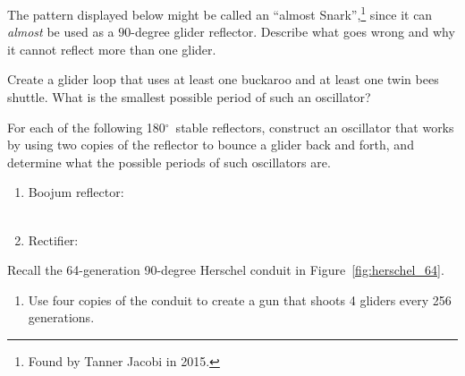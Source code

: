 \begin{multicols}{2}
	
	\mfilbreak
	
	
	\begin{problemstar}\label{exer:almost_snark}
		The pattern displayed below might be called an ``almost Snark'',\footnote{Found by Tanner Jacobi in 2015.} since it can \emph{almost} be used as a $90$-degree glider reflector. Describe what goes wrong and why it cannot reflect more than one glider.
		
		\begin{center}
		\end{center}
	\end{problemstar}
	
	
	\mfilbreak
	
	
	\begin{problem}\label{exer:buckaroo_loop}
		Create a glider loop that uses at least one buckaroo and at least one twin bees shuttle. What is the smallest possible period of such an oscillator? %
	\end{problem}
	
	
	\mfilbreak
	
	\begin{problem}\label{exer:new_reflectors}
		For each of the following 180$^\circ$~stable reflectors, construct an oscillator that works by using two copies of the reflector to bounce a glider back and forth, and determine what the possible periods of such oscillators are.
		\begin{enumerate}[label=\bf\color{ocre}(\alph*)]
			\item Boojum reflector: \\ \\[0.5em]
			
			\item Rectifier: \\ 
		\end{enumerate}
	\end{problem}
	
	
	\mfilbreak
	
	
	\begin{problem}\label{exer:machine_gun}
		Recall the 64-generation 90-degree Herschel conduit in Figure~\ref{fig:herschel_64}.
		\begin{enumerate}[label=\bf\color{ocre}(\alph*)]
			\item Use four copies of the conduit to create a gun that shoots 4 gliders every 256 generations.
			

\end{enumerate}
\end{problem}
\end{multicols}
